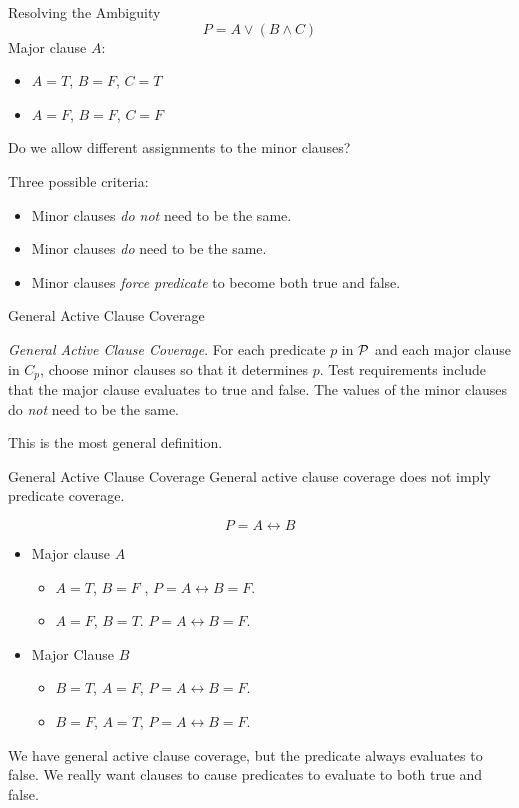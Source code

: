 \documentclass{beamer}
\newcommand{\predset}{{\cal P}}
\begin{document}
\begin{frame}{Resolving the Ambiguity}
\[
P = A \lor (B \land C)
\]
Major clause $A$:
\begin{itemize}
\item $A=T$, $B=F$, $C=T$
\item $A=F$, $B=F$, $C=F$
\end{itemize}
Do we allow different assignments to the minor clauses?

Three possible criteria:
\begin{itemize}
\item Minor clauses {\em do not } need to be the same.
\item Minor clauses {\em do} need to be the same.
\item Minor clauses {\em force predicate} to become both true and false.
\end{itemize}
  
\end{frame}
\begin{frame}{General Active Clause Coverage}

{\em General Active Clause Coverage}. For each predicate $p$ in
$\predset$ and each major clause in $C_p$, choose minor clauses so
that it determines $p$. Test requirements include that the major
clause evaluates to true and false. The values of the minor clauses do
{\em not} need to be the same.

This is the most general definition. 
\end{frame}
\begin{frame}{General Active Clause Coverage}
General active clause coverage does not imply predicate coverage.

\[
P = A \leftrightarrow B
\]
\begin{itemize}
\item Major clause $A$
  \begin{itemize}
  \item $A=T$, $B=F$ , $P = A\leftrightarrow B = F$.
  \item $A=F$, $B=T$.  $P = A\leftrightarrow B = F$.
  \end{itemize}
\item Major Clause $B$
  \begin{itemize}
  \item $B=T$, $A=F$, $P = A\leftrightarrow B = F$.
  \item $B=F$, $A=T$, $P = A\leftrightarrow B = F$.
  \end{itemize}
\end{itemize}
We have general active clause coverage, but the predicate always
evaluates to false. We really want clauses to cause predicates to
evaluate to both true and false.
  
\end{frame}
\end{document}
